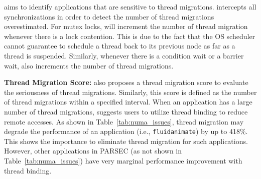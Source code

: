 \NP{} aims to identify applications that are sensitive to thread migrations. \NP{} intercepts all synchronizations in order to detect the number of thread migrations overestimated. For mutex locks, \NP{} will increment the number of thread migration whenever there is a lock contention. This is due to the fact that the OS scheduler cannot guarantee to schedule a thread back to its previous node as far as a thread is suspended. Similarly, whenever there is a condition wait or a barrier wait, \NP{} also increments the number of thread migrations. 

\textbf{Thread Migration Score:} \NP{} also proposes a thread migration score to evaluate the seriousness of thread migrations. Similarly, this score is defined as the number of thread migrations within a specified interval. When an application has a large number of thread migrations,  \NP{} suggests users to utilize thread binding to reduce remote accesses. As shown in Table~\ref{tab:numa_issues}, thread migration may degrade the performance of an application (i.e., \texttt{fluidanimate}) by up to 418\%. This shows the importance to eliminate thread migration for such applications. However, other applications in PARSEC (as not shown in Table~\ref{tab:numa_issues}) have very marginal performance improvement with thread binding. 



